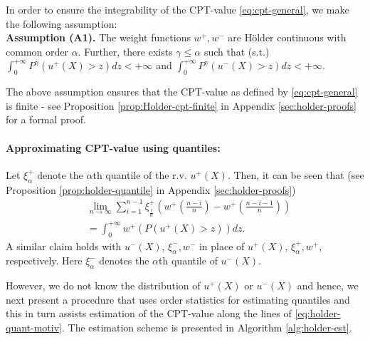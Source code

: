 In order to ensure the integrability of the CPT-value \eqref{eq:cpt-general}, we make the following assumption:\\[1ex]
\textbf{Assumption (A1).}  
The weight functions $w^+, w^-$ are H\"{o}lder continuous with common order $\alpha$. Further,
there exists $ \gamma \le \alpha$ such that (s.t.)
$\int_0^{+\infty} P^{\gamma} (u^+(X)>z) dz < +\infty$ and $\int_0^{+\infty} P^{\gamma} (u^-(X)>z) dz < +\infty.$

The above assumption ensures that the CPT-value as defined by \eqref{eq:cpt-general} is finite - see Proposition \ref{prop:Holder-cpt-finite} in 
Appendix \ref{sec:holder-proofs} for a formal proof.


\paragraph{Approximating CPT-value using quantiles:}
Let $\xi^+_{\alpha}$ denote the $\alpha$th quantile of the r.v. $u^+(X)$. 
Then, it can be seen that (see Proposition \ref{prop:holder-quantile} in Appendix \ref{sec:holder-proofs})
\begin{align}
&\lim_{n \rightarrow \infty} \sum_{i=1}^{n-1} \xi^+_{\frac{i}{n}} \left(w^+\left(\frac{n-i}{n}\right)- w^+\left(\frac{n-i-1}{n}\right) \right) \nonumber\\
&= \int_0^{+\infty} w^+(P(u^+(X)>z)) dz.\label{eq:holder-quant-motiv}
\end{align}
A similar claim holds with $u^-(X)$, $\xi^-_{\alpha}, w^-$ in place of  $u^+(X)$, $\xi^+_{\alpha}, w^+$, respectively. Here $\xi^-_{\alpha}$ denotes the 
$\alpha$th quantile of $u^-(X)$.

However, we do not know the distribution of $u^+(X)$ or $u^-(X)$ and hence, we next present a procedure that uses order statistics for estimating quantiles and this in turn assists estimation of the CPT-value along the lines of \eqref{eq:holder-quant-motiv}. The estimation scheme is presented in Algorithm \ref{alg:holder-est}.

